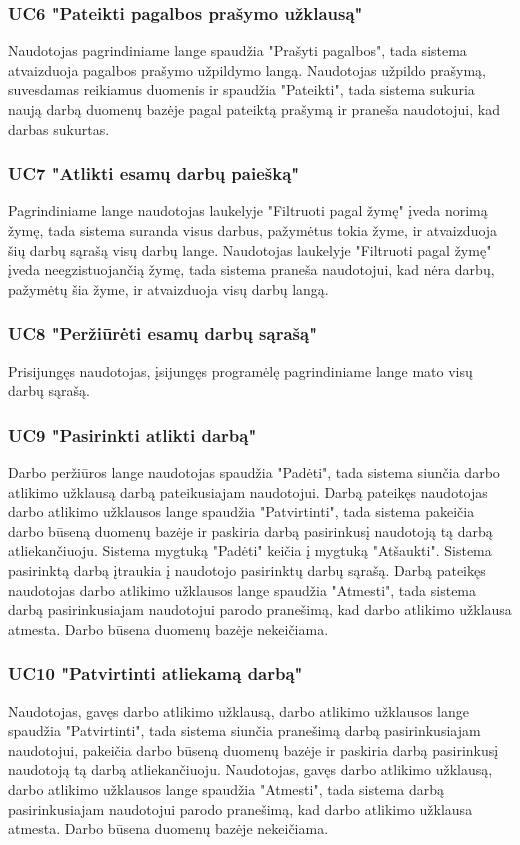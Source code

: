 \documentclass{VUMIFPSbakalaurinis}
\begin{document}
\subsubsection{UC6 "Pateikti pagalbos prašymo užklausą"}
Naudotojas pagrindiniame lange spaudžia "Prašyti pagalbos", tada sistema atvaizduoja pagalbos prašymo užpildymo langą. Naudotojas užpildo prašymą, suvesdamas reikiamus duomenis ir spaudžia "Pateikti", tada sistema sukuria naują darbą duomenų bazėje pagal pateiktą prašymą ir praneša naudotojui, kad darbas sukurtas.
\subsubsection{UC7 "Atlikti esamų darbų paiešką"}
Pagrindiniame lange naudotojas laukelyje "Filtruoti pagal žymę" įveda norimą žymę, tada sistema suranda visus darbus, pažymėtus tokia žyme, ir atvaizduoja šių darbų sąrašą visų darbų lange.
Naudotojas laukelyje "Filtruoti pagal žymę" įveda neegzistuojančią žymę, tada sistema praneša naudotojui, kad nėra darbų, pažymėtų šia žyme, ir atvaizduoja visų darbų langą.
\subsubsection{UC8 "Peržiūrėti esamų darbų sąrašą"}
Prisijungęs naudotojas, įsijungęs programėlę pagrindiniame lange mato visų darbų sąrašą.
\subsubsection{UC9 "Pasirinkti atlikti darbą"}
Darbo peržiūros lange naudotojas spaudžia "Padėti", tada sistema siunčia darbo atlikimo užklausą darbą pateikusiajam naudotojui. Darbą pateikęs naudotojas darbo atlikimo užklausos lange spaudžia "Patvirtinti", tada sistema pakeičia darbo būseną duomenų bazėje ir paskiria darbą pasirinkusį naudotoją tą darbą atliekančiuoju. Sistema mygtuką "Padėti" keičia į mygtuką "Atšaukti". Sistema pasirinktą darbą įtraukia į naudotojo pasirinktų darbų sąrašą.
Darbą pateikęs naudotojas darbo atlikimo užklausos lange spaudžia "Atmesti", tada sistema darbą pasirinkusiajam naudotojui parodo pranešimą, kad darbo atlikimo užklausa atmesta. Darbo būsena duomenų bazėje nekeičiama.
\subsubsection{UC10 "Patvirtinti atliekamą darbą"}
Naudotojas, gavęs darbo atlikimo užklausą, darbo atlikimo užklausos lange spaudžia "Patvirtinti", tada sistema siunčia pranešimą darbą pasirinkusiajam naudotojui, pakeičia darbo būseną duomenų bazėje ir paskiria darbą pasirinkusį naudotoją tą darbą atliekančiuoju.
Naudotojas, gavęs darbo atlikimo užklausą, darbo atlikimo užklausos lange spaudžia "Atmesti", tada sistema darbą pasirinkusiajam naudotojui parodo pranešimą, kad darbo atlikimo užklausa atmesta. Darbo būsena duomenų bazėje nekeičiama.
\end{document}
